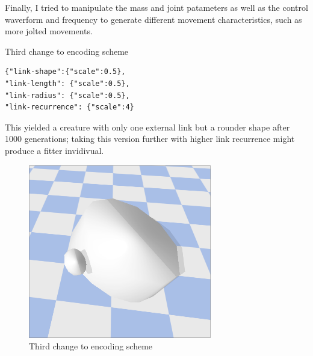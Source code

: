 Finally, I tried to manipulate the mass and joint patameters as well as the control waverform and frequency to generate different movement characteristics, such as more jolted movements.

\begin{listing}[H]
    \caption{Third change to encoding scheme}
    \begin{lstlisting}
{"link-shape":{"scale":0.5}, 
"link-length": {"scale":0.5},
"link-radius": {"scale":0.5},
"link-recurrence": {"scale":4}\end{lstlisting}
\end{listing}

This yielded a creature with only one external link but a rounder shape after 1000 generations; taking this version further with higher link recurrence might produce a fitter invidivual.

\begin{figure}[H]
    \centering
    \includegraphics[width=8cm]{cr3}
    \caption{Third change to encoding scheme}
    \label{fig:cr3}
\end{figure}







